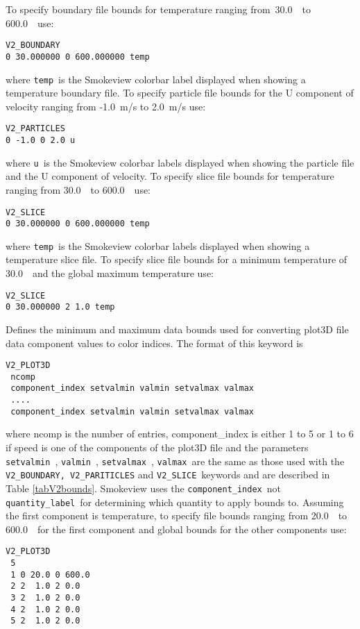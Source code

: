 \documentclass[11pt,twoside]{book}
\begin{document}
{To specify boundary file bounds for temperature ranging from\
30.0~\degC\ to 600.0~\degC\ use:
\begin{lstlisting}
V2_BOUNDARY
0 30.000000 0 600.000000 temp
\end{lstlisting}
where {\tt temp}\ is the Smokeview colorbar label displayed when
showing a temperature boundary file.
To specify particle file bounds for the U component of velocity ranging from
-1.0~m/s to 2.0~m/s use:
\begin{lstlisting}
V2_PARTICLES
0 -1.0 0 2.0 u
\end{lstlisting}
where {\tt u}\ is the Smokeview colorbar labels displayed when
showing the particle file and the U component of velocity.
To specify slice file bounds for temperature ranging from
30.0~\degC\ to 600.0~\degC\ use:
\begin{lstlisting}
V2_SLICE
0 30.000000 0 600.000000 temp
\end{lstlisting}
where {\tt temp}\ is the Smokeview colorbar labels displayed when
showing a temperature slice file.
To specify slice file bounds for a minimum temperature of
30.0~\degC\ and the global maximum temperature use:
\begin{lstlisting}
V2_SLICE
0 30.000000 2 1.0 temp
\end{lstlisting}





Defines the minimum and maximum
data bounds used for converting plot3D file data component values to color indices.
The format of this keyword is
\begin{lstlisting}
V2_PLOT3D
 ncomp
 component_index setvalmin valmin setvalmax valmax
 ....
 component_index setvalmin valmin setvalmax valmax
\end{lstlisting}
where ncomp is the number of entries,
component\_index is either 1 to 5 or 1 to 6 if speed is one of the components of
the plot3D file  and
the parameters {\tt setvalmin}\ , {\tt valmin}\ ,  {\tt setvalmax}\ , {\tt valmax}\  are the same
as those used with the {\tt V2\_BOUNDARY, V2\_PARITICLES} and {\tt V2\_SLICE}\ keywords and are
described in Table \ref{tabV2bounds}. Smokeview uses the {\tt component\_index}\ not {\tt quantity\_label}\
for determining which quantity to apply bounds to.
Assuming the first component is temperature, to specify file bounds ranging from 20.0~\degC\ to
600.0~\degC\ for the first component and global bounds for the other components use:
\begin{lstlisting}
V2_PLOT3D
 5
 1 0 20.0 0 600.0
 2 2  1.0 2 0.0
 3 2  1.0 2 0.0
 4 2  1.0 2 0.0
 5 2  1.0 2 0.0
\end{lstlisting}

}
\end{document}
